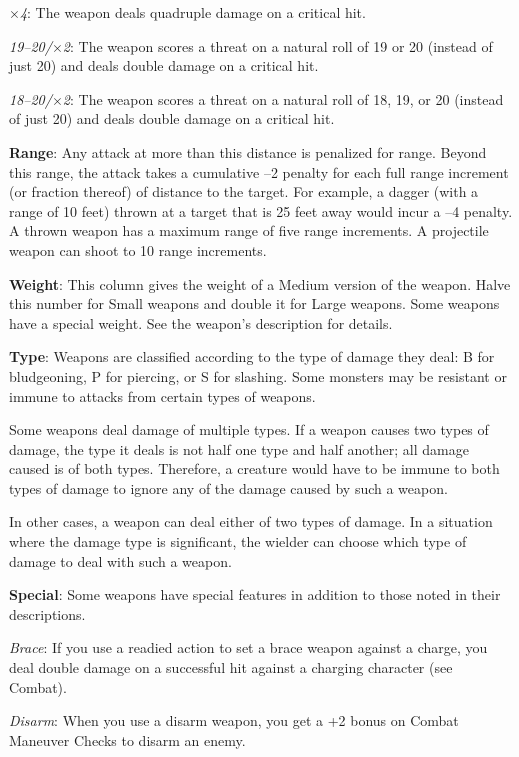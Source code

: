 \mbox{$\times$}\textit{4}: The weapon deals quadruple damage on a critical hit.
		
\textit{19--20/}\mbox{$\times$}\textit{2}: The weapon scores a threat on a natural roll of 19 or 20 (instead of just 20) and deals double damage on a critical hit. 
		
\textit{18--20/}\mbox{$\times$}\textit{2}: The weapon scores a threat on a natural roll of 18, 19, or 20 (instead of just 20) and deals double damage on a critical hit. 
		
\textbf{Range}: Any attack at more than this distance is penalized for range. Beyond this range, the attack takes a cumulative --2 penalty for each full range increment (or fraction thereof) of distance to the target. For example, a dagger (with a range of 10 feet) thrown at a target that is 25 feet away would incur a --4 penalty. A thrown weapon has a maximum range of five range increments. A projectile weapon can shoot to 10 range increments.
		
\textbf{Weight}: This column gives the weight of a Medium version of the weapon. Halve this number for Small weapons and double it for Large weapons. Some weapons have a special weight. See the weapon's description for details.
		
\textbf{Type}: Weapons are classified according to the type of damage they deal: B for bludgeoning, P for piercing, or S for slashing. Some monsters may be resistant or immune to attacks from certain types of weapons.
		
Some weapons deal damage of multiple types. If a weapon causes two types of damage, the type it deals is not half one type and half another; all damage caused is of both types. Therefore, a creature would have to be immune to both types of damage to ignore any of the damage caused by such a weapon.
		
In other cases, a weapon can deal either of two types of damage. In a situation where the damage type is significant, the wielder can choose which type of damage to deal with such a weapon.
		
\textbf{Special}: Some weapons have special features in addition to those noted in their descriptions. 
		
\textit{Brace}: If you use a readied action to set a brace weapon against a charge, you deal double damage on a successful hit against a charging character (see Combat).
		
\textit{Disarm}: When you use a disarm weapon, you get a +2 bonus on Combat Maneuver Checks to disarm an enemy.
		
